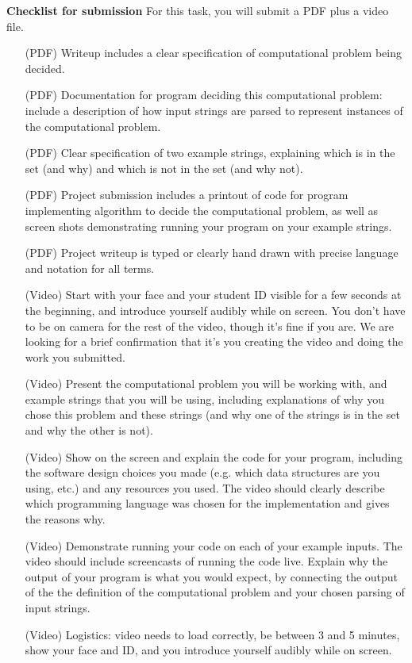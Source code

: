 \newpage
{\bf Checklist for submission} For this task, you will submit a PDF plus a video file.

\vspace{-10pt}

\begin{itemize}
   \item[(PDF)] Writeup includes a clear specification of computational problem being decided.
   \item[(PDF)] Documentation for program deciding this computational problem: 
   include a description of how input strings are parsed to represent
   instances of the computational problem.
   \item[(PDF)] Clear specification of two example strings, explaining which is in the set (and why) and which is not in the set (and why not).
   \item[(PDF)] Project submission includes a printout of code for program implementing algorithm to decide the computational problem, as well as screen shots demonstrating running your program on your 
   example strings.
   \item[(PDF)] Project writeup is typed or clearly hand drawn with precise language and notation for all terms.
   \item[(Video)] Start with your face and your student ID visible for a few seconds at the beginning, and introduce yourself audibly while on screen. You don't have to be on camera for the  rest of the video, though it's fine if you are. We are looking for a brief confirmation that  it's you creating the video and doing the work you submitted.
\item[(Video)] Present the computational problem you will be working with, and 
example strings that you will be using, including explanations of why you chose this problem and these strings (and why one of the strings is in the set 
and why the other is not).
\item[(Video)] Show on the screen and explain the code for your program, including the software design choices you made
(e.g. which data structures are you using, etc.) and any resources you used. The video 
should clearly describe which programming language was chosen 
for the implementation and gives the reasons why.
\item[(Video)] Demonstrate running your code on each of your example inputs. The video should include screencasts of 
running the code live.
Explain why the output of your program is what you would expect, by connecting the output of the the definition of the computational problem and your chosen parsing of input strings.
\item[(Video)] Logistics: video needs to load correctly, be between 3 and 5 minutes, 
show your face and ID, and you introduce yourself 
audibly while on screen.
\end{itemize}

